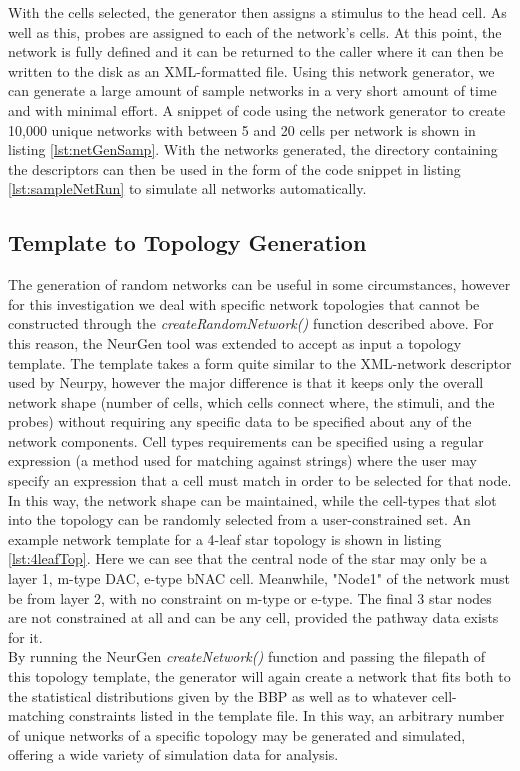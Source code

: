 With the cells selected, the generator then assigns a stimulus to the head cell. As well as this, probes are assigned to each of the network's cells. At this point, the network is fully defined and it can be returned to the caller where it can then be written to the disk as an XML-formatted file. Using this network generator, we can generate a large amount of sample networks in a very short amount of time and with minimal effort. A snippet of code using the network generator to create 10,000 unique networks with between 5 and 20 cells per network is shown in listing \ref{lst:netGenSamp}.
With the networks generated, the directory containing the descriptors can then be used in the form of the code snippet in listing \ref{lst:sampleNetRun} to simulate all networks automatically.

\subsection{Template to Topology Generation}
The generation of random networks can be useful in some circumstances, however for this investigation we deal with specific network topologies that cannot be constructed through the \emph{createRandomNetwork()} function described above. For this reason, the NeurGen tool was extended to accept as input a topology template. The template takes a form quite similar to the XML-network descriptor used by Neurpy, however the major difference is that it keeps only the overall network shape (number of cells, which cells connect where, the stimuli, and the probes) without requiring any specific data to be specified about any of the network components. Cell types requirements can be specified using a regular expression (a method used for matching against strings) where the user may specify an expression that a cell must match in order to be selected for that node. In this way, the network shape can be maintained, while the cell-types that slot into the topology can be randomly selected from a user-constrained set. An example network template for a 4-leaf star topology is shown in listing \ref{lst:4leafTop}. Here we can see that the central node of the star may only be a layer 1, m-type DAC, e-type bNAC cell. Meanwhile, "Node1" of the network must be from layer 2, with no constraint on m-type or e-type. The final 3 star nodes are not constrained at all and can be any cell, provided the pathway data exists for it.\\
By running the NeurGen \emph{createNetwork()} function and passing the filepath of this topology template, the generator will again create a network that fits both to the statistical distributions given by the BBP as well as to whatever cell-matching constraints listed in the template file. In this way, an arbitrary number of unique networks of a specific topology may be generated and simulated, offering a wide variety of simulation data for analysis.

